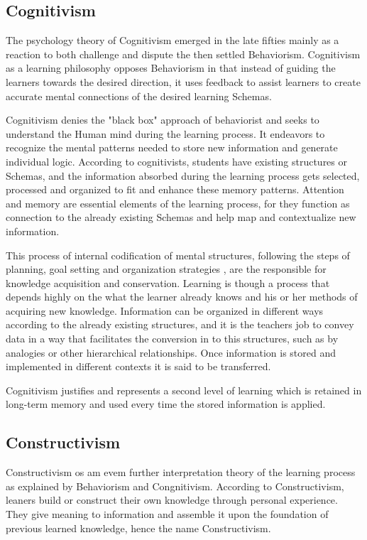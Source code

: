 \subsection{Cognitivism}

The psychology theory of Cognitivism emerged in the late fifties mainly as a 
reaction to both challenge and dispute the then settled Behaviorism.
Cognitivism as a learning philosophy opposes Behaviorism in that instead of 
guiding the learners towards the desired direction, it uses feedback to assist 
learners to create accurate mental connections of the desired learning Schemas.

Cognitivism denies the "black box" approach of behaviorist and seeks to understand
the Human mind during the learning process. It endeavors to recognize the mental 
patterns needed to store new information and generate individual logic.
According to cognitivists, students have existing structures or Schemas, and 
the information absorbed during the learning process gets selected, processed
and organized to fit and enhance these memory patterns. \cite{johnson}
Attention and memory are essential elements of the learning process, for they 
function as connection to the already existing Schemas and help map and contextualize
new information. 

This process of internal codification of mental structures, following the steps
of planning, goal setting and organization strategies \cite{johnson}, are the 
responsible for knowledge acquisition and conservation. Learning is though a 
process that depends highly on the what the learner already knows and his or her
methods of acquiring new knowledge. Information can be organized in different 
ways according to the already existing structures, and it is the teachers 
job to convey data in a way that facilitates the conversion in to this structures, 
such as by analogies or other hierarchical relationships. Once information is 
stored and implemented in different contexts it is said to be transferred. \cite{schunk}

Cognitivism justifies and represents a second level of learning which is retained
in long-term memory and used every time the stored information is applied.




\subsection{Constructivism}

Constructivism os am evem further interpretation theory of the learning process 
as explained by Behaviorism and Congnitivism. According to Constructivism, leaners
build or construct their own knowledge through personal experience. They give meaning
to information and assemble it upon the foundation of previous learned knowledge, 
hence the name Constructivism.

